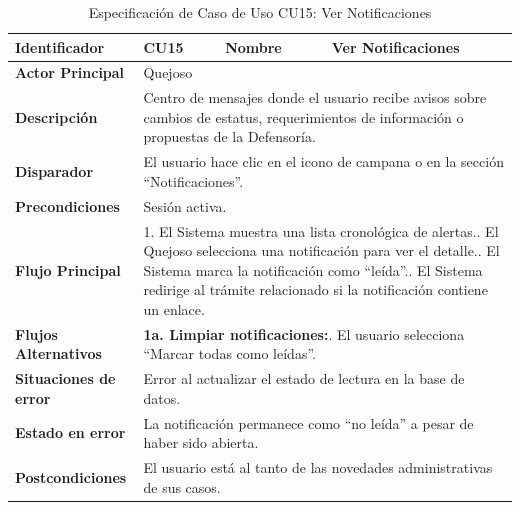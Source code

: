 \vspace{0.8cm}

\begingroup
\setlength{\parskip}{0pt}
\begin{longtable}{|p{3.5cm}|p{2cm}|p{2.5cm}|p{7cm}|}
\caption{Especificación de Caso de Uso CU15: Ver Notificaciones}
\label{tab:cu15_ver_notificaciones} \\
\hline
\textbf{Identificador} & CU15 & \textbf{Nombre} & Ver Notificaciones \\ \hline
\textbf{Actor Principal} & \multicolumn{3}{p{11.5cm}|}{Quejoso} \\ \hline
\textbf{Descripción} & \multicolumn{3}{p{11.5cm}|}{Centro de mensajes donde el usuario recibe avisos sobre cambios de estatus, requerimientos de información o propuestas de la Defensoría.} \\ \hline
\textbf{Disparador} & \multicolumn{3}{p{11.5cm}|}{El usuario hace clic en el icono de campana o en la sección ``Notificaciones''.} \\ \hline
\textbf{Precondiciones} & \multicolumn{3}{p{11.5cm}|}{Sesión activa.} \\ \hline
\textbf{Flujo Principal} & \multicolumn{3}{p{11.5cm}|}{1. El Sistema muestra una lista cronológica de alertas.\newline 2. El Quejoso selecciona una notificación para ver el detalle.\newline 3. El Sistema marca la notificación como ``leída''.\newline 4. El Sistema redirige al trámite relacionado si la notificación contiene un enlace.} \\ \hline
\textbf{Flujos Alternativos} & \multicolumn{3}{p{11.5cm}|}{\textbf{1a. Limpiar notificaciones:}\newline 1. El usuario selecciona ``Marcar todas como leídas''.} \\ \hline
\textbf{Situaciones de error} & \multicolumn{3}{p{11.5cm}|}{Error al actualizar el estado de lectura en la base de datos.} \\ \hline
\textbf{Estado en error} & \multicolumn{3}{p{11.5cm}|}{La notificación permanece como ``no leída'' a pesar de haber sido abierta.} \\ \hline
\textbf{Postcondiciones} & \multicolumn{3}{p{11.5cm}|}{El usuario está al tanto de las novedades administrativas de sus casos.} \\ \hline
\end{longtable}
\endgroup

\vspace{0.8cm}

